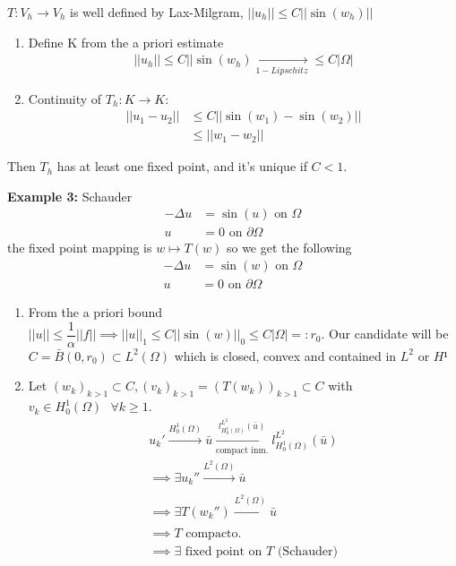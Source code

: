 $T:V_h\to V_h $ is well defined by Lax-Milgram, $||u_h||\leq C||\sin(w_h)||$
\begin{enumerate}
    \item Define K from the a priori estimate
    \begin{align*}
        ||u_h||\leq C||\sin(w_h)\xrightarrow[1-Lipschitz]{} \leq C|\Omega| \tag{$\forall v_h\in B(0,r)=:K$, r= $C|\Omega|$}
    \end{align*}
    \item Continuity of $T_h:K\to K$:
    \begin{align*}
        ||u_1-u_2||&\leq C||\sin(w_1)-\sin(w_2)||\\
        &\leq ||w_1-w_2||
    \end{align*}
\end{enumerate}
Then $T_h$ has at least one fixed point, and it's unique if $C<1$.

\textbf{Example 3:} Schauder
\begin{align*}
    -\Delta u &= \sin(u) \text{ on }\Omega\\
    u&=0\text{ on }\partial\Omega
\end{align*}
the fixed point mapping is $w\mapsto T(w)$ so we get the following
\begin{align*}
    -\Delta u &= \sin(w) \text{ on }\Omega\\
    u&=0\text{ on }\partial\Omega
\end{align*}
\begin{enumerate}
    \item From the a priori bound $||u||\leq\dfrac{1}{\alpha}||f||\implies ||u||_1\leq C||\sin(w)||_0\leq C|\Omega|=:r_0$. Our candidate will be $C = \bar{B}(0,r_0)\subset L^2(\Omega)$ which is closed, convex and contained in $L^2$ or $H¹$
    \item Let $(w_k)_{k>1} \subset C, (v_k)_{k>1}=(T(w_k))_{k>1}\subset C$ with $v_k\in H_0^1(\Omega)\text{     }\forall k\geq 1$. 
    \begin{align*}
        u_k'\xrightarrow[]{H_0^1(\Omega)} \bar u\xrightarrow[\text{compact inm.}]{l^{L^2}_{H_0^1(\Omega)}(\bar u)} l^{L^2}_{H_0^1(\Omega)}(\bar u)\\
        \implies \exists u_k'' \xrightarrow[]{L^2(\Omega)}\bar u\\
        \implies \exists T(w_k'')\xrightarrow[]{L^2(\Omega)}\bar u\\
        \implies T \text{ compacto.}\\
        \implies \exists\text{ fixed point on } T \text{ (Schauder)}
    \end{align*}
    
\end{enumerate}